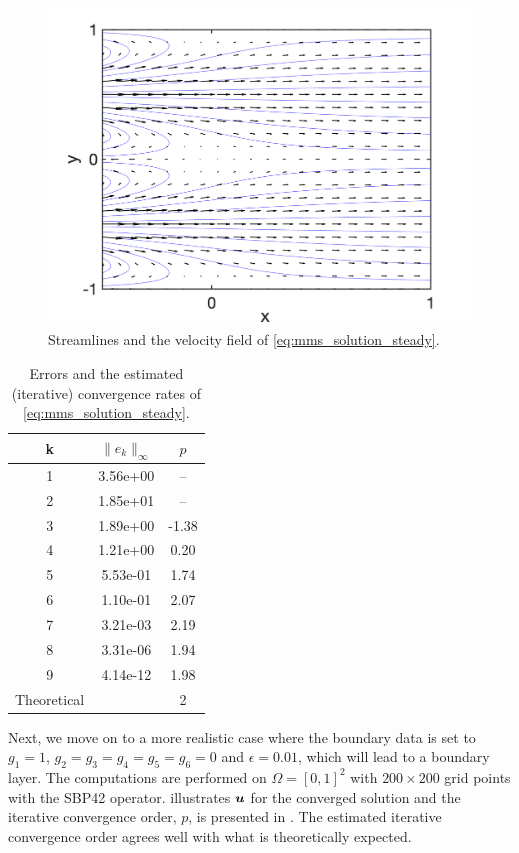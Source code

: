 \begin{figure}
 \centering
  \includegraphics[scale = 0.3]{images/kovaszany}
  \caption{Streamlines and the velocity field of \eqref{eq:mms_solution_steady}.}
  \label{fig:streamlines}
\end{figure}
\begin{table}
\centering
\caption{Errors and the estimated (iterative) convergence rates of \eqref{eq:mms_solution_steady}.}
\begin{tabular}{c| cc }
 \hline
k & $\|e_k\|_\infty$ & $p$
\\
\hline
1 & 3.56e+00  & -- \\
2 & 1.85e+01  & --  \\
3 & 1.89e+00  & -1.38 \\
4 & 1.21e+00  &  0.20 \\
5 & 5.53e-01  &  1.74 \\
6 & 1.10e-01  &  2.07 \\
7 & 3.21e-03  &  2.19 \\
8 & 3.31e-06  &  1.94 \\
9 & 4.14e-12  &  1.98 \\
\hline
Theoretical && 2
\end{tabular}
\label{tab:newton_convergence}
\end{table}

Next, we move on to a more realistic case where the boundary data is set to $g_1 = 1$, $g_2 = g_3 = g_4 = g_5 = g_6 = 0$ and $\epsilon = 0.01$, which will lead to a boundary layer. The computations are performed on $\Omega = [0,1]^2$ with $200\times 200$ grid points with the SBP42 operator.  illustrates $\bm{u}$ for the converged solution and the iterative convergence order, $p$, is presented in . The estimated iterative convergence order agrees well with what is theoretically expected. 

